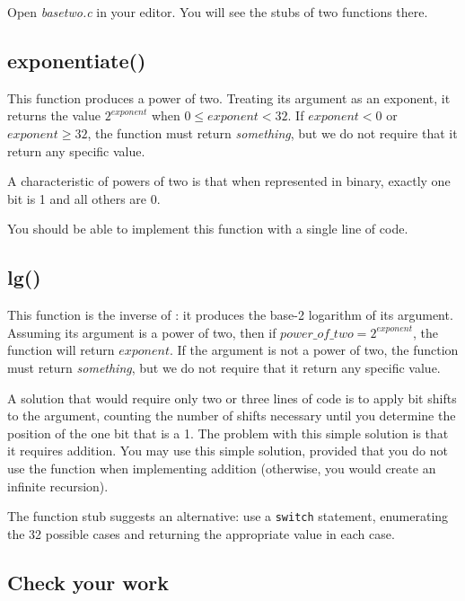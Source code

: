 Open \textit{basetwo.c} in your editor.
You will see the stubs of two functions there.


\subsection{exponentiate()}

This function produces a power of two.
Treating its argument as an exponent, it returns the value $2^{exponent}$ when $0 \le exponent < 32$.
If $exponent < 0$ or $exponent \ge 32$, the function must return \textit{something}, but we do not require that it return any specific value.

A characteristic of powers of two is that when represented in binary, exactly one bit is 1 and all others are 0.

You should be able to implement this function with a single line of code.


\subsection{lg()}

This function is the inverse of :
it produces the base-2 logarithm of its argument.
Assuming its argument is a power of two, then if $power\_of\_two = 2^{exponent}$, the function will return $exponent$.
If the argument is not a power of two, the function must return \textit{something}, but we do not require that it return any specific value.

A solution that would require only two or three lines of code is to apply bit shifts to the argument, counting the number of shifts necessary until you determine the position of the one bit that is a 1.
The problem with this simple solution is that it requires addition.
You may use this simple solution, provided that you do not use the  function when implementing addition (otherwise, you would create an infinite recursion).

The function stub suggests an alternative:
use a \lstinline{switch} statement, enumerating the 32 possible cases and returning the appropriate value in each case.


\subsection*{Check your work}

